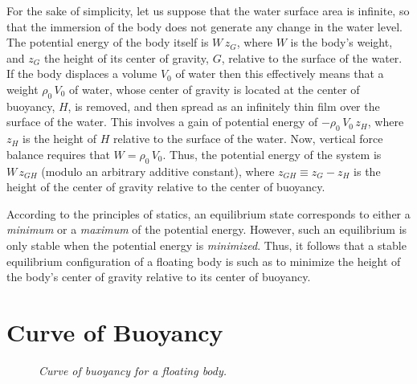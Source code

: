 For the sake of simplicity, let us suppose that the water  surface area  is infinite, so that the immersion of the body does not
generate any change in  the water level. The potential energy of the body itself is $W\,z_G$, where 
$W$ is the body's weight, and $z_G$ the height of its center of gravity, $G$,  relative to the surface of the water. If the
body displaces a volume $V_0$ of water then this  effectively means that a weight $\rho_0\,V_0$ of water, whose
center of gravity is located at the center of buoyancy, $H$, is removed, and then spread as an infinitely thin film
over the surface of the water. This involves a gain of potential energy of $-\rho_0\,V_0\,z_H$, where
$z_H$ is the height of $H$ relative to the surface of the water. Now, vertical force balance requires that
$W=\rho_0\,V_0$. Thus, the potential energy of the system is  $W\,z_{GH}$ (modulo an arbitrary additive constant), where 
$z_{GH} \equiv z_G-z_H$ is the height of the center of gravity relative to the center of buoyancy. 

According to the  principles of statics, an equilibrium state corresponds to either  a {\em minimum}\/
or a {\em maximum}\/ 
of the potential energy. However, such an equilibrium is only stable when the potential energy is  {\em minimized}. 
Thus, it follows that a stable equilibrium configuration of a floating body is such as to minimize 
the height of the body's center of gravity relative to its center of buoyancy.

\section{Curve of Buoyancy}
\begin{figure}
\epsfysize=3.5in
\centerline{}
\caption{\em Curve of buoyancy for a floating body.}\label{f6.02}
\end{figure}

